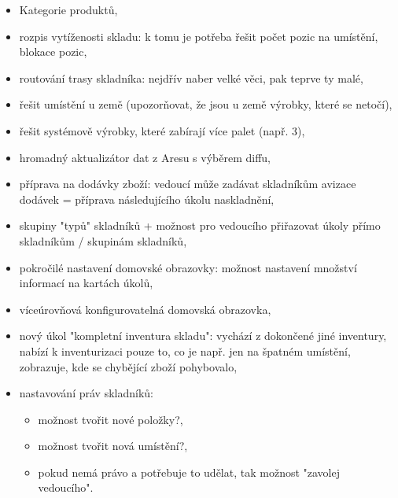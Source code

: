 \begin{itemize}
	\item Kategorie produktů,
	\item rozpis vytíženosti skladu: k tomu je potřeba řešit počet pozic na umístění, blokace pozic,
	\item routování trasy skladníka: nejdřív naber velké věci, pak teprve ty malé,
	\item řešit umístění u země (upozorňovat, že jsou u země výrobky, které se netočí),
	\item řešit systémově výrobky, které zabírají více palet (např. 3),
	\item hromadný aktualizátor dat z Aresu s výběrem diffu,
	\item příprava na dodávky zboží: vedoucí může zadávat skladníkům avizace dodávek = příprava následujícího úkolu naskladnění,
	\item skupiny "typů" skladníků + možnost pro vedoucího přiřazovat úkoly přímo skladníkům / skupinám skladníků,
	\item pokročilé nastavení domovské obrazovky: možnost nastavení množství informací na kartách úkolů,
	\item víceúrovňová konfigurovatelná domovská obrazovka,
	\item nový úkol "kompletní inventura skladu": vychází z dokončené jiné inventury, nabízí k inventurizaci pouze to, co je např. jen na špatném umístění, zobrazuje, kde se chybějící zboží pohybovalo,
	\item nastavování práv skladníků:
	\begin{itemize}
		\item možnost tvořit nové položky?,
		\item možnost tvořit nová umístění?,
		\item pokud nemá právo a potřebuje to udělat, tak možnost "zavolej vedoucího".
	\end{itemize}
\end{itemize}
